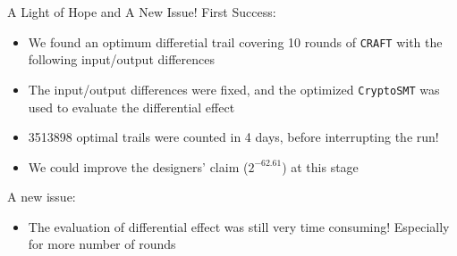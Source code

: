 \documentclass{beamer}
\begin{document}

\begin{frame}{A Light of Hope and A New Issue!}
First Success:
\begin{itemize}
\item 
We found an optimum differetial trail covering 10 rounds of \texttt{CRAFT} with the following input/output differences
\end{itemize}
\begin{center}
\end{center}
\begin{itemize}
\item The input/output differences were fixed, and the optimized \texttt{CryptoSMT} was used to evaluate the differential effect
\item 
3513898 optimal trails were counted in 4 days, before interrupting the run!
\item We could improve the designers' claim ($2^{-62.61}$) at this stage 
\end{itemize}
A new issue:
\begin{itemize}
\item The evaluation of differential effect was still very time consuming! Especially for more number of rounds
\end{itemize}
\end{frame}
\end{document}
